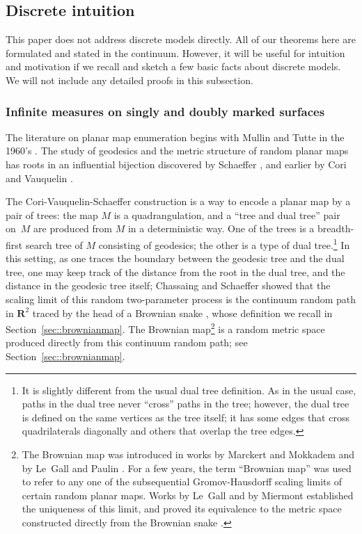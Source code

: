 \documentclass[10pt]{amsart}
\theoremstyle{plain}
\numberwithin{theorem}{section}
\theoremstyle{definition}
\newcommand{\R}{\mathbf{R}}
\begin{document}
\subsection{Discrete intuition}
\label{subsec::discreteintuition}

This paper does not address discrete models directly. All of our theorems here are formulated and stated in the continuum. However, it will be useful for intuition and motivation if we recall and sketch a few basic facts about discrete models. We will not include any detailed proofs in this subsection.

\subsubsection{Infinite measures on singly and doubly marked surfaces}
The literature on planar map enumeration begins with Mullin and Tutte in the 1960's \cite{tutte1962census,mullintrees,MR0218276}. The study of geodesics and the metric structure of random planar maps has roots in an influential bijection discovered by Schaeffer \cite{MR1465581}, and earlier by Cori and Vauquelin \cite{cori1981planar}.

The Cori-Vauquelin-Schaeffer construction is a way to encode a planar map by a pair of trees: the map $M$ is a quadrangulation, and a ``tree and dual tree'' pair on~$M$ are produced from $M$ in a deterministic way. One of the trees is a breadth-first search tree of $M$ consisting of geodesics; the other is a type of dual tree.\footnote{It is slightly different from the usual dual tree definition. As in the usual case, paths in the dual tree never ``cross'' paths in the tree; however, the dual tree is defined on the same vertices as the tree itself; it has some edges that cross quadrilaterals diagonally and others that overlap the tree edges.} In this setting, as one traces the boundary between the geodesic tree and the dual tree, one may keep track of the distance from the root in the dual tree, and the distance in the geodesic tree itself; Chassaing and Schaeffer showed that the scaling limit of this random two-parameter process is the continuum random path in $\R^2$ traced by the head of a Brownian snake \cite{chassaingschaeffer}, whose definition we recall in Section~\ref{sec::brownianmap}.
The Brownian map\footnote{The Brownian map was introduced in works by Marckert and Mokkadem and by Le~Gall and Paulin \cite{marckert2006limit,le2008scaling}. For a few years, the term ``Brownian map'' was used to refer to any one of the subsequential Gromov-Hausdorff scaling limits of certain random planar maps. Works by Le~Gall and by Miermont established the uniqueness of this limit, and proved its equivalence to the metric space constructed directly from the Brownian snake \cite{legalluniqueanduniversal, miermontlimit, legalluniversallimit}.}
is a random metric space produced directly from this continuum random path; see Section~\ref{sec::brownianmap}.
\end{document}
